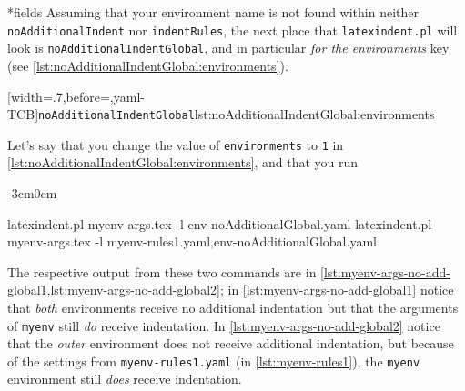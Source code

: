 \documentclass[10pt]{article}
\newenvironment{widepage}{\begin{adjustwidth}{-3cm}{0cm}}{\end{adjustwidth}}
\begin{document}
*{fields}
 Assuming that your environment name is not found within neither
 \texttt{noAdditionalIndent} nor \texttt{indentRules}, the next place that
 \texttt{latexindent.pl} will look is \texttt{noAdditionalIndentGlobal}, and in
 particular \emph{for the environments} key (see
 \cref{lst:noAdditionalIndentGlobal:environments}).

 [width=.7\linewidth,before=\centering,yaml-TCB]{\texttt{noAdditionalIndentGlobal}}{lst:noAdditionalIndentGlobal:environments}

 \begin{example}
 Let's say that you change the value of \texttt{environments} to \texttt{1} in
 \cref{lst:noAdditionalIndentGlobal:environments}, and that you run 

 \begin{widepage}

  \begin{commandshell}
latexindent.pl myenv-args.tex -l env-noAdditionalGlobal.yaml
latexindent.pl myenv-args.tex -l myenv-rules1.yaml,env-noAdditionalGlobal.yaml
\end{commandshell}

 \end{widepage}

 The respective output from these two commands are in
 \cref{lst:myenv-args-no-add-global1,lst:myenv-args-no-add-global2}; in
 \cref{lst:myenv-args-no-add-global1} notice that \emph{both} environments receive no
 additional indentation but that the arguments of \texttt{myenv} still \emph{do} receive
 indentation. In \cref{lst:myenv-args-no-add-global2} notice that the \emph{outer}
 environment does not receive additional indentation, but because of the settings from
 \texttt{myenv-rules1.yaml} (in \vref{lst:myenv-rules1}), the \texttt{myenv} environment
 still \emph{does} receive indentation.

 \begin{cmhtcbraster}
 \end{cmhtcbraster}
 \end{example}
\end{document}

